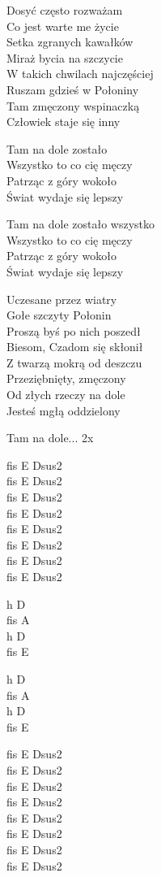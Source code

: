 \begin{text}
    Dosyć często rozważam\\
    Co jest warte me życie\\
    Setka zgranych kawałków\\
    Miraż bycia na szczycie\\
    W takich chwilach najczęściej\\
    Ruszam gdzieś w Połoniny\\
    Tam zmęczony wspinaczką\\
    Człowiek staje się inny

    \vin Tam na dole zostało\\
    \vin Wszystko to co cię męczy\\
    \vin Patrząc z góry wokoło\\
    \vin Świat wydaje się lepszy

    \vin Tam na dole zostało wszystko\\
    \vin Wszystko to co cię męczy\\
    \vin Patrząc z góry wokoło\\
    \vin Świat wydaje się lepszy

    Uczesane przez wiatry\\
    Gołe szczyty Połonin\\
    Proszą byś po nich poszedł\\
    Biesom, Czadom się skłonił\\
    Z twarzą mokrą od deszczu\\
    Przeziębnięty, zmęczony\\
    Od złych rzeczy na dole\\
    Jesteś mgłą oddzielony

    \vin Tam na dole... 2x   
\end{text}
\begin{chord}
    fis E Dsus2\\
    fis E Dsus2\\
    fis E Dsus2\\
    fis E Dsus2\\
    fis E Dsus2\\
    fis E Dsus2\\
    fis E Dsus2\\
    fis E Dsus2

    h D\\
    fis A\\
    h D\\
    fis E
    
    h D\\
    fis A\\
    h D\\
    fis E

    fis E Dsus2\\
    fis E Dsus2\\
    fis E Dsus2\\
    fis E Dsus2\\
    fis E Dsus2\\
    fis E Dsus2\\
    fis E Dsus2\\
    fis E Dsus2
\end{chord}
